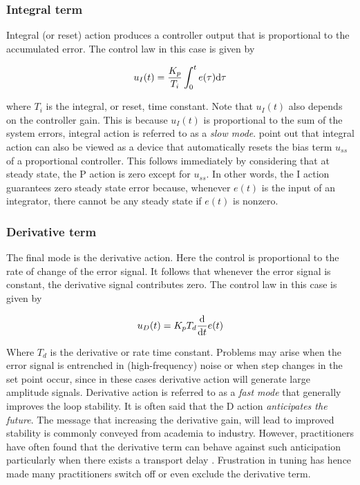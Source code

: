 \subsubsection*{Integral term}

Integral (or reset) action produces a controller output that is proportional to the accumulated error. The control law in this case is given by

\[u_I( t ) = \frac{K_p}{T_i}\int_0^t e(\tau)\mathrm{d} \tau \]

\noindent where $T_i$ is the integral, or reset, time constant. Note that $u_I(t)$ also depends on the controller gain. This is because  $u_I(t)$ is proportional to the sum of the system errors, integral action is referred to as a \emph{slow mode}. \citet{astromhagglund2006} point out that integral action can also be viewed as a device that automatically resets the bias term $u_{ss}$ of a proportional controller. This follows immediately by considering that at steady state,  the P action is zero except for $u_{ss}$. In other words, the I action guarantees zero steady state error because, whenever $e(t)$ is the input of an integrator, there cannot be any steady state if $e(t)$ is nonzero.

\subsubsection*{Derivative term}

The final mode is the derivative  action. Here the control is proportional to the rate of change of the error signal. It follows that whenever the error signal is constant, the derivative signal contributes zero. The control law in this case is given by

\[u_D(t) = K_pT_d \frac{\mathrm{d}}{\mathrm{d} t}e(t)\]

Where $T_d$ is the derivative or rate time constant. Problems may arise when the error signal is entrenched in (high-frequency) noise or when step changes in the set point occur, since in these cases derivative action will generate large amplitude signals. Derivative action is referred to as a \emph{fast mode} that generally improves the loop stability. It is often said that the D action \emph{anticipates the future}. The message that increasing the derivative gain, will lead to improved stability is commonly conveyed from academia to industry. However, practitioners have often found that the derivative term can behave against such anticipation particularly when there exists a transport delay \citep{VilanovaBook2012}. Frustration in tuning  has hence made many practitioners switch off or even exclude the derivative term.  


